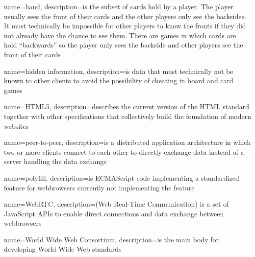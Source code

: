 {
  name=hand,
  description={is the subset of cards hold by a player. The player usually sees
  the front of their cards and the other players only see the backsides. It must
  technically be impossible for other players to know the fronts if they did
  not already have the chance to see them. There are games in which cards are
  hold “backwards” so the player only sees the backside and other players see
  the front of their cards}
}

{
  name={hidden information},
  description={is data that must technically not be known to other clients to
  avoid the possibility of cheating in board and card games}
}

{
  name=HTML5,
  description={describes the current version of the HTML standard together with
  other specifications that collectively build the foundation of modern
  websites}
}



{
  name=peer-to-peer,
  description={is a distributed application architecture in which two or more
  clients connect to each other to directly exchange data instead of a server
  handling the data exchange}
}

{
  name=polyfill,
  description={is \gls{ECMAScript} code implementing a standardized feature for
  webbrowsers currently not implementing the feature}
}


{
  name=WebRTC,
  description={(Web Real-Time Communication) is a set of JavaScript \glspl{API}
  to enable direct connections and data exchange between webbrowsers}
}

{
  name={World Wide Web Consortium},
  description={is the main body for developing World Wide Web standards}
}
